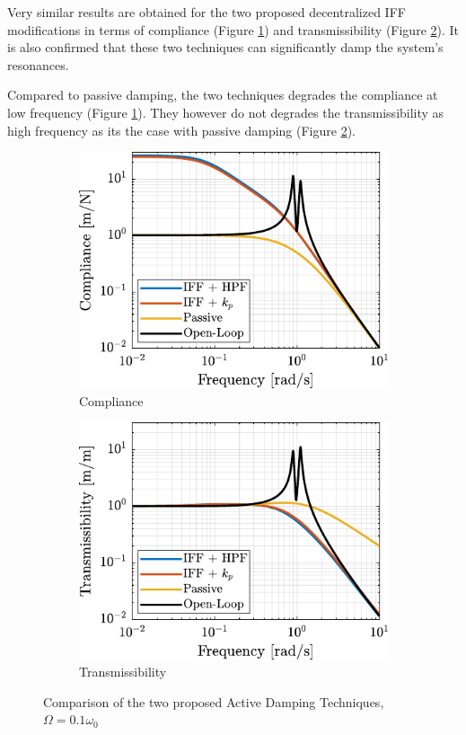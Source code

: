 \documentclass{ISMA_USD2020}
\begin{document}
Very similar results are obtained for the two proposed decentralized IFF modifications in terms of compliance (Figure \ref{fig:comp_compliance}) and transmissibility (Figure \ref{fig:comp_transmissibility}).
It is also confirmed that these two techniques can significantly damp the system's resonances.

Compared to passive damping, the two techniques degrades the compliance at low frequency (Figure \ref{fig:comp_compliance}).
They however do not degrades the transmissibility as high frequency as its the case with passive damping (Figure \ref{fig:comp_transmissibility}).

\begin{figure}[htbp]
\begin{subfigure}[c]{0.45\linewidth}
\includegraphics[width=\linewidth]{figs/comp_compliance.pdf}
\caption{\label{fig:comp_compliance} Compliance}
\end{subfigure}
\begin{subfigure}[c]{0.45\linewidth}
\includegraphics[width=\linewidth]{figs/comp_transmissibility.pdf}
\caption{\label{fig:comp_transmissibility} Transmissibility}
\end{subfigure}
\caption{\label{fig:comp_active_damping}Comparison of the two proposed Active Damping Techniques, \(\Omega = 0.1 \omega_0\)}
\centering
\end{figure}
\end{document}
